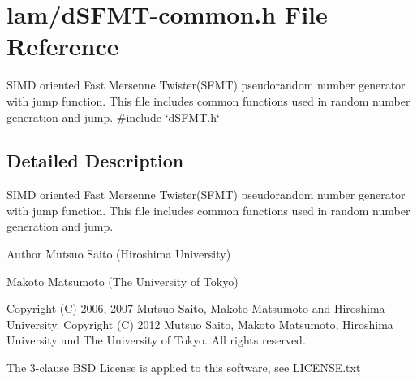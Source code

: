 \hypertarget{dSFMT-common_8h}{
\section{lam/dSFMT-\/common.h File Reference}
\label{dSFMT-common_8h}
}


SIMD oriented Fast Mersenne Twister(SFMT) pseudorandom number generator with jump function. This file includes common functions used in random number generation and jump.  
{\ttfamily \#include \char`\"{}dSFMT.h\char`\"{}}\par


\subsection{Detailed Description}
SIMD oriented Fast Mersenne Twister(SFMT) pseudorandom number generator with jump function. This file includes common functions used in random number generation and jump. \begin{DoxyAuthor}{Author}
Mutsuo Saito (Hiroshima University) 

Makoto Matsumoto (The University of Tokyo)
\end{DoxyAuthor}
Copyright (C) 2006, 2007 Mutsuo Saito, Makoto Matsumoto and Hiroshima University. Copyright (C) 2012 Mutsuo Saito, Makoto Matsumoto, Hiroshima University and The University of Tokyo. All rights reserved.

The 3-\/clause BSD License is applied to this software, see LICENSE.txt 